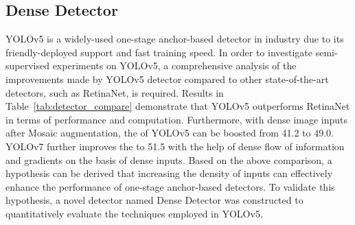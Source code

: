 \documentclass[10pt,twocolumn,letterpaper]{article}
\begin{document}
\subsection{Dense Detector}
\begin{table}
  \caption{Comparison with Faster R-CNN, FCOS, YOLOv5, YOLOv7, RetinaNet and Dense Detector. The top section shows results for object detectors without Mosaic augmentation, the middle section shows results with Mosaic augmentation during training. Dense Detector  achieves comparable results to RetinaNet baseline, having lower FLOPs but greatly improved . Both Faster R-CNN, FCOS, RetinaNet and Dense Detector uses ResNet-50-FPN as backbone.  is reported on COCO val dataset.}
  \label{tab:detector_compare}
\end{table}
YOLOv5\cite{jocher2022ultralytics} is a widely-used one-stage anchor-based detector in industry due to its friendly-deployed support and fast training speed. In order to investigate semi-supervised experiments on YOLOv5, a comprehensive analysis of the improvements made by YOLOv5 detector compared to other state-of-the-art detectors, such as RetinaNet, is required.  Results in Table~\ref{tab:detector_compare} demonstrate that YOLOv5  outperforms RetinaNet in terms of performance and computation. Furthermore, with dense image inputs after Mosaic augmentation, the  of YOLOv5 can be boosted from 41.2 to 49.0. YOLOv7 further improves the  to 51.5 with the help of dense flow of information and gradients on the basis of dense inputs. Based on the above comparison, a hypothesis can be derived that increasing the density of inputs can effectively enhance the performance of one-stage anchor-based detectors. To validate this hypothesis, a novel detector named Dense Detector was constructed to quantitatively evaluate the techniques employed in YOLOv5.
\end{document}
